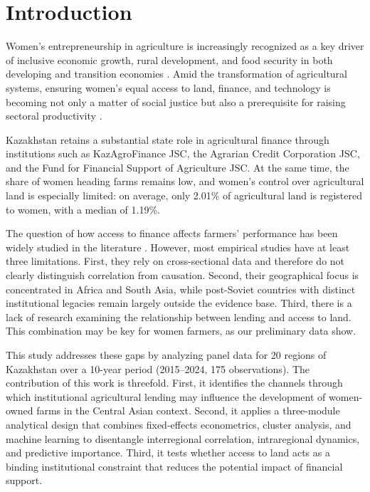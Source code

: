 ﻿\documentclass[pdflatex,sn-mathphys-ay]{sn-jnl}
\begin{document}


\maketitle

\section{Introduction}\label{sec:introduction}

Women's entrepreneurship in agriculture is increasingly recognized as a key driver of inclusive economic growth, rural development, and food security in both developing and transition economies \citep{ref78}. Amid the transformation of agricultural systems, ensuring women's equal access to land, finance, and technology is becoming not only a matter of social justice but also a prerequisite for raising sectoral productivity \citep{ref62,ref26}.

Kazakhstan retains a substantial state role in agricultural finance through institutions such as KazAgroFinance JSC, the Agrarian Credit Corporation JSC, and the Fund for Financial Support of Agriculture JSC. At the same time, the share of women heading farms remains low, and women's control over agricultural land is especially limited: on average, only 2.01\% of agricultural land is registered to women, with a median of 1.19\%.

The question of how access to finance affects farmers' performance has been widely studied in the literature \citep{ref94,ref99}. However, most empirical studies have at least three limitations. First, they rely on cross-sectional data and therefore do not clearly distinguish correlation from causation. Second, their geographical focus is concentrated in Africa and South Asia, while post-Soviet countries with distinct institutional legacies remain largely outside the evidence base. Third, there is a lack of research examining the relationship between lending and access to land. This combination may be key for women farmers, as our preliminary data show.

This study addresses these gaps by analyzing panel data for 20 regions of Kazakhstan over a 10-year period (2015--2024, 175 observations). The contribution of this work is threefold. First, it identifies the channels through which institutional agricultural lending may influence the development of women-owned farms in the Central Asian context. Second, it applies a three-module analytical design that combines fixed-effects econometrics, cluster analysis, and machine learning to disentangle interregional correlation, intraregional dynamics, and predictive importance. Third, it tests whether access to land acts as a binding institutional constraint that reduces the potential impact of financial support.
\end{document}
